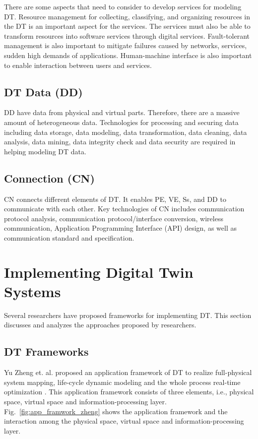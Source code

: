 \documentclass[article]{aaltoseries}
\begin{document}
There are some aspects that need to consider to develop services for modeling DT. Resource management for collecting, classifying, and organizing resources in the DT is an important aspect for the services. The services must also be able to transform resources into software services through digital services. Fault-tolerant management is also important to mitigate failures caused by networks, services, sudden high demands of applications. Human-machine interface is also important to enable interaction between users and services.

\subsection{DT Data (DD)}
DD have data from physical and virtual parts. Therefore, there are a massive amount of heterogeneous data. Technologies for processing and securing data including data storage, data modeling, data transformation, data cleaning, data analysis, data mining, data integrity check and data security are required in helping modeling DT data.

\subsection{Connection (CN)}
CN connects different elements of DT. It enables PE, VE, Ss, and DD to communicate with each other. Key technologies of CN includes communication protocol analysis, communication protocol/interface conversion, wireless communication, Application Programming Interface (API) design, as well as communication standard and specification.

\section{Implementing Digital Twin Systems}
Several researchers have proposed frameworks for implementing DT. This section discusses and analyzes the approaches proposed by researchers.

\subsection{DT Frameworks}
Yu Zheng et. al. proposed an application framework of DT to realize full-physical system mapping, life-cycle dynamic modeling and the whole process real-time optimization \cite{zheng2019application}. This application framework consists of three elements, i.e., physical space, virtual space and information-processing layer. Fig.~\ref{fig:app_framwork_zheng} shows the application framework and the interaction among the physical space, virtual space and information-processing layer.
\end{document}
